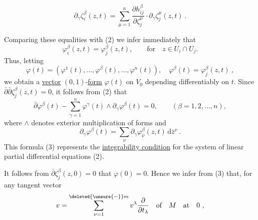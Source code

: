 \[
\partial_\gamma\zeta_i^\beta(z,t)=\sum_{\mu=1}^n
\frac{\partial h_{ij}^\beta}{\partial\zeta_j^\mu}\cdot\partial_\gamma\zeta_j^\mu(z,t)\ .
\]

Comparing these equalities with (2) we infer immediately that
\[
\varphi_i^\beta(z,t)=\varphi_j^\beta(z,t),\qquad\text{for}\quad z\in U_i\cap U_j.
\]
Thus, letting
\[
\varphi(t)=(\varphi^1(t),\ldots,\varphi^\beta(t),\ldots,\varphi^n(t)),\quad
\varphi^\beta(t)=\varphi_j^\beta(z,t)\ ,
\]
we obtain a \uline{vector} $(0,1)$-\uline{form} $\varphi(t)$ on $V_0$ depending
differentiably on $t$. Since $\bar\partial\bar\partial\zeta_j^\beta(z,t)=0$, it follows from
(2) that
\[
\bar\partial\varphi^\beta(t)-\sum_{\gamma=1}^n\varphi^\gamma(t)\wedge\partial_\gamma\varphi^\beta(t)=0,\qquad
(\beta=1,2,\ldots,n),\tag*{(3)}
\]
where $\wedge$ denotes exterior multiplication of forms and
\[
\partial_\gamma\varphi^\beta(t)=\sum_\nu\partial_\gamma\varphi_{\bar\nu}^\beta(z,t)\,\mathrm d\bar z^\nu\ .
\]
This formula (3) represents the \uline{integrability condition} for the
system of linear partial differential equations (2).

It follows from $\bar\partial\zeta_j^\beta(z,0)=0$ that $\varphi(0)=0$. Hence we
infer from (3) that, for any tangent vector
\[
v=\sum_{\nu=1}^{\deleted{\unsure{-}}m}v^\lambda\frac{\partial}{\partial t_\lambda}\quad\text{of}\quad M\quad\text{at}\quad0\ ,
\]

